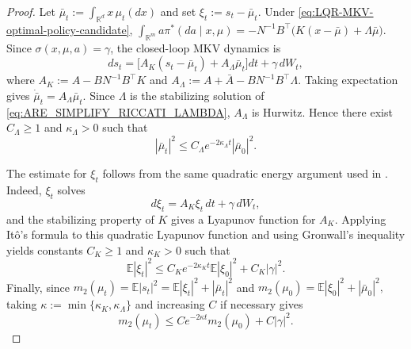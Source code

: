 \documentclass[a4paper, 10pt, english, reqno]{amsart}
\begin{document}
\begin{proof}
Let $\bar\mu_t:=\int_{\mathbb R^d}x\,\mu_t(dx)$ and set $\xi_t:=s_t-\bar\mu_t$. Under \eqref{eq:LQR-MKV-optimal-policy-candidate}, $\int_{\mathbb R^m}a\pi^*(da\mid x,\mu)
=
-N^{-1}B^\top\bigl(K(x-\bar\mu)+\Lambda\bar\mu\bigr).$
Since $\sigma(x,\mu,a)=\gamma$, the closed-loop MKV dynamics is
\[
d s_t
=
\bigl[A_K(s_t-\bar\mu_t)+A_\Lambda\bar\mu_t\bigr]dt
+
\gamma\,dW_t,
\]
where $A_K:=A-BN^{-1}B^\top K$ and $A_\Lambda:=A+\bar A-BN^{-1}B^\top\Lambda.$ Taking expectation gives $\dot{\bar\mu}_t=A_\Lambda\bar\mu_t$. Since $\Lambda$ is the stabilizing solution of \eqref{eq:ARE_SIMPLIFY_RICCATI_LAMBDA}, $A_\Lambda$ is Hurwitz. Hence there exist $C_\Lambda\ge1$ and $\kappa_\Lambda>0$ such that
\[
|\bar\mu_t|^2
\le
C_\Lambda e^{-2\kappa_\Lambda t}|\bar\mu_0|^2.
\]

The estimate for $\xi_t$ follows from the same quadratic energy argument used in \cite[Lemma~A.8]{firstpaper}. Indeed, $\xi_t$ solves
\[
d\xi_t=A_K\xi_t\,dt+\gamma\,dW_t,
\]
and the stabilizing property of $K$ gives a Lyapunov function for $A_K$. Applying It\^o's formula to this quadratic Lyapunov function and using Gronwall's inequality yields constants $C_K\ge1$ and $\kappa_K>0$ such that
\[
\mathbb E|\xi_t|^2
\le
C_K e^{-2\kappa_K t}\mathbb E|\xi_0|^2
+
C_K|\gamma|^2.
\]
Finally, since $m_2(\mu_t)=\mathbb E|s_t|^2=\mathbb E|\xi_t|^2+|\bar\mu_t|^2$ and $m_2(\mu_0)=\mathbb E|\xi_0|^2+|\bar\mu_0|^2,$ taking $\kappa:=\min\{\kappa_K,\kappa_\Lambda\}$ and increasing $C$ if necessary gives
\[
m_2(\mu_t)
\le
C e^{-2\kappa t}m_2(\mu_0)+C|\gamma|^2.
\]
\end{proof}



    
\end{document}
